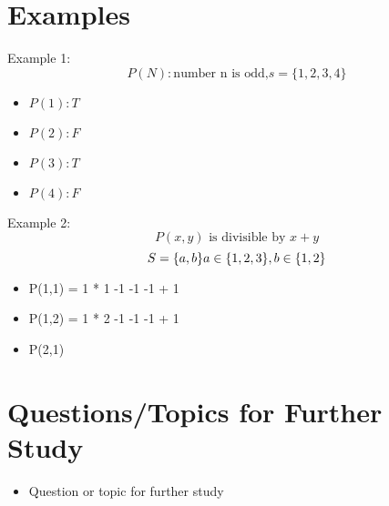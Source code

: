 \documentclass[12pt,a4paper]{article}
\begin{document}
\section{Examples}
\begin{tcolorbox}
  Example 1: 
  \begin{equation}
    P(N): \text{number n is odd,} s = \{1,2,3,4\}  
  \end{equation}
  \begin{itemize}
    \item \( P(1): T \)
    \item \( P(2): F \)
    \item \( P(3): T \)
    \item \( P(4): F \)
  \end{itemize}

  Example 2: 
  \begin{equation}
    P(x,y) \text{ is divisible by } x + y
  \end{equation}
  \begin{equation}
    S = \{a,b\}  a \in \{1,2,3\}, b \in \{1,2\}  \\
  \end{equation}
  \begin{itemize}
    \item P(1,1) = 1 * 1  -1 -1 -1 + 1  
    \item P(1,2) = 1 * 2  -1 -1 -1 + 1  
    \item P(2,1)  
  \end{itemize}

\end{tcolorbox}

\section{Questions/Topics for Further Study}
\begin{itemize}
  \item Question or topic for further study
\end{itemize}
\end{document}
